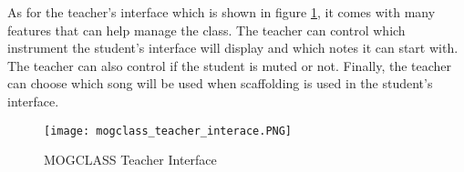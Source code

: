 As for the teacher’s interface which is shown in figure \ref{fig:mogclass_teacher_interface}, it comes with many features that can help manage the class. The teacher can control which instrument the student’s interface will display and which notes it can start with. The teacher can also control if the student is muted or not. Finally, the teacher can choose which song will be used when scaffolding is used in the student’s interface.

\begin{figure}[H]
    \centering
    \texttt{[image: mogclass\_teacher\_interace.PNG]}
    \caption{MOGCLASS Teacher Interface \protect\cite{zhou2011mogclass}}
    \label{fig:mogclass_teacher_interface}
\end{figure}




